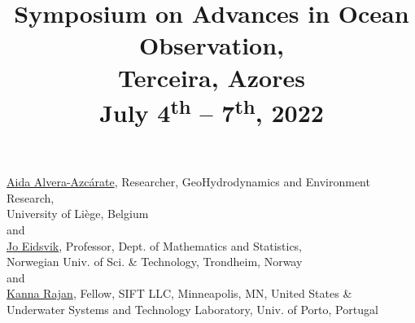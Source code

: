 \documentclass[12pt,letterpaper]{article}
\title{Symposium on Advances in Ocean Observation,\\
  Terceira, Azores\\
  \large{\textbf{July 4\textsuperscript{th} -- 7\textsuperscript{th},
      2022}}}
\date{}
\begin{document}
\maketitle{}

\vspace{-1.75cm}
\begin{center}
   \href{http://modb.oce.ulg.ac.be/mediawiki/index.php/User:Aida}{\textsf{Aida Alvera-Azc\'{a}rate}},
  Researcher, GeoHydrodynamics and Environment Research,\\
  University of Li\`{e}ge, Belgium\\
  and\\
  \href{https://www.ntnu.edu/employees/jo.eidsvik}{\textsf{Jo Eidsvik}},
  Professor, Dept. of Mathematics and Statistics, \\Norwegian Univ. of
  Sci. \& Technology, Trondheim, Norway\\
  and\\
  \href{https://kanna.rajan.systems}{\textsf{Kanna Rajan}},
  Fellow, SIFT LLC, Minneapolis, MN, United States \& \\Underwater Systems and Technology
  Laboratory, Univ. of Porto, Portugal\\
\end{center}





\newpage


\renewcommand{\thepage}{}
\end{document}
